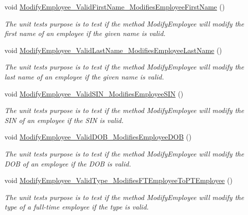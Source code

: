\begin{DoxyCompactItemize}
void \hyperlink{class_the_company_1_1_tests_1_1_modify_employee_tests_ab840eaeb50954107b3f3daaab0ccbc45}{Modify\+Employee\+\_\+\+Valid\+First\+Name\+\_\+\+Modifies\+Employee\+First\+Name} ()
\begin{DoxyCompactList}\small\item\em The unit test\textquotesingle{}s purpose is to test if the method Modify\+Employee will modify the first name of an employee if the given name is valid. \end{DoxyCompactList}\item 
void \hyperlink{class_the_company_1_1_tests_1_1_modify_employee_tests_ac3d3aa84fe241c767a29dbd4a4abce02}{Modify\+Employee\+\_\+\+Valid\+Last\+Name\+\_\+\+Modifies\+Employee\+Last\+Name} ()
\begin{DoxyCompactList}\small\item\em The unit test\textquotesingle{}s purpose is to test if the method Modify\+Employee will modify the last name of an employee if the given name is valid. \end{DoxyCompactList}\item 
void \hyperlink{class_the_company_1_1_tests_1_1_modify_employee_tests_aec348eb5d68edeabf142fb764d57ea6f}{Modify\+Employee\+\_\+\+Valid\+S\+I\+N\+\_\+\+Modifies\+Employee\+S\+I\+N} ()
\begin{DoxyCompactList}\small\item\em The unit test\textquotesingle{}s purpose is to test if the method Modify\+Employee will modify the S\+I\+N of an employee if the S\+I\+N is valid. \end{DoxyCompactList}\item 
void \hyperlink{class_the_company_1_1_tests_1_1_modify_employee_tests_a21523890431daa17edbef28fc564dbef}{Modify\+Employee\+\_\+\+Valid\+D\+O\+B\+\_\+\+Modifies\+Employee\+D\+O\+B} ()
\begin{DoxyCompactList}\small\item\em The unit test\textquotesingle{}s purpose is to test if the method Modify\+Employee will modify the D\+O\+B of an employee if the D\+O\+B is valid. \end{DoxyCompactList}\item 
void \hyperlink{class_the_company_1_1_tests_1_1_modify_employee_tests_a41d34a950b0cbc27e31db6b827214189}{Modify\+Employee\+\_\+\+Valid\+Type\+\_\+\+Modifies\+F\+T\+Employee\+To\+P\+T\+Employee} ()
\begin{DoxyCompactList}\small\item\em The unit test\textquotesingle{}s purpose is to test if the method Modify\+Employee will modify the type of a full-\/time employee if the type is valid. \end{DoxyCompactList}\item 

\end{DoxyCompactItemize}
